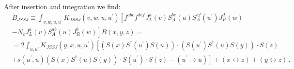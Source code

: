 \documentclass[11pt,a4paper]{article}
\begin{document}
After insertion and integration we find:
\begin{equation}\begin{split}
&
\dot B_{JSSJ}\equiv
 \int_{v,w,u,u^{\prime}}K_{JSSJ}(v,w,u,u^{\prime})\left[f^{abc}f^{def}J_{L}^{a}(v)S_A^{be}(u)S_A^{cf}(u^{\prime})J_{R}^{d}(w)\right. \\
&\left. -N_{c}J_{L}^{a}(v)S_A^{ab}(u)J_{R}^{b}(w)\right]B(x,y,z)=\\
&=2 \int_{u,u^{\prime}} K_{JSSJ}(y,x,u,u^{\prime})\left[(S(x)S^{\dagger}(u^{\prime})S(u))\cdot(S(u^{\prime})S^{\dagger}(u)S(y))\cdot S(z)  \right.\\
&\left. + s(u^{\prime},u)(S(x)S^{\dagger}(u)S(y))\cdot S(u^{\prime})\cdot S(z)- (u^\prime\rightarrow u)\right] +(x\leftrightarrow z)+(y\leftrightarrow z)\,.\\
\end{split}\end{equation}
\end{document}
